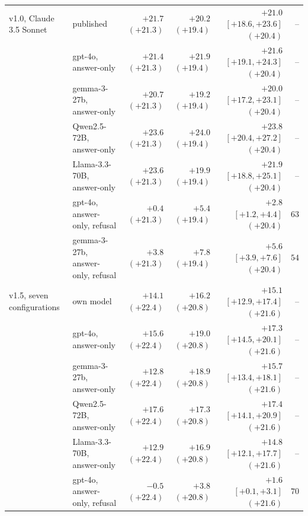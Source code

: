 \documentclass{article}
\begin{document}
\begin{table}[htbp]
{\begin{tabular}{llrrrr}
v1.0, Claude 3.5 Sonnet & published & $+21.7$ {\scriptsize$(+21.3)$} & $+20.2$ {\scriptsize$(+19.4)$} & $+21.0$ {\scriptsize$[+18.6,+23.6]$} {\scriptsize$(+20.4)$} & --\\
 & gpt-4o, answer-only & $+21.4$ {\scriptsize$(+21.3)$} & $+21.9$ {\scriptsize$(+19.4)$} & $+21.6$ {\scriptsize$[+19.1,+24.3]$} {\scriptsize$(+20.4)$} & --\\
 & gemma-3-27b, answer-only & $+20.7$ {\scriptsize$(+21.3)$} & $+19.2$ {\scriptsize$(+19.4)$} & $+20.0$ {\scriptsize$[+17.2,+23.1]$} {\scriptsize$(+20.4)$} & --\\
 & Qwen2.5-72B, answer-only & $+23.6$ {\scriptsize$(+21.3)$} & $+24.0$ {\scriptsize$(+19.4)$} & $+23.8$ {\scriptsize$[+20.4,+27.2]$} {\scriptsize$(+20.4)$} & --\\
 & Llama-3.3-70B, answer-only & $+23.6$ {\scriptsize$(+21.3)$} & $+19.9$ {\scriptsize$(+19.4)$} & $+21.9$ {\scriptsize$[+18.8,+25.1]$} {\scriptsize$(+20.4)$} & --\\
 & gpt-4o, answer-only, refusal & $+0.4$ {\scriptsize$(+21.3)$} & $+5.4$ {\scriptsize$(+19.4)$} & $+2.8$ {\scriptsize$[+1.2,+4.4]$} {\scriptsize$(+20.4)$} & $63$\\
 & gemma-3-27b, answer-only, refusal & $+3.8$ {\scriptsize$(+21.3)$} & $+7.8$ {\scriptsize$(+19.4)$} & $+5.6$ {\scriptsize$[+3.9,+7.6]$} {\scriptsize$(+20.4)$} & $54$\\
v1.5, seven configurations & own model & $+14.1$ {\scriptsize$(+22.4)$} & $+16.2$ {\scriptsize$(+20.8)$} & $+15.1$ {\scriptsize$[+12.9,+17.4]$} {\scriptsize$(+21.6)$} & --\\
 & gpt-4o, answer-only & $+15.6$ {\scriptsize$(+22.4)$} & $+19.0$ {\scriptsize$(+20.8)$} & $+17.3$ {\scriptsize$[+14.5,+20.1]$} {\scriptsize$(+21.6)$} & --\\
 & gemma-3-27b, answer-only & $+12.8$ {\scriptsize$(+22.4)$} & $+18.9$ {\scriptsize$(+20.8)$} & $+15.7$ {\scriptsize$[+13.4,+18.1]$} {\scriptsize$(+21.6)$} & --\\
 & Qwen2.5-72B, answer-only & $+17.6$ {\scriptsize$(+22.4)$} & $+17.3$ {\scriptsize$(+20.8)$} & $+17.4$ {\scriptsize$[+14.1,+20.9]$} {\scriptsize$(+21.6)$} & --\\
 & Llama-3.3-70B, answer-only & $+12.9$ {\scriptsize$(+22.4)$} & $+16.9$ {\scriptsize$(+20.8)$} & $+14.8$ {\scriptsize$[+12.1,+17.7]$} {\scriptsize$(+21.6)$} & --\\
 & gpt-4o, answer-only, refusal & $-0.5$ {\scriptsize$(+22.4)$} & $+3.8$ {\scriptsize$(+20.8)$} & $+1.6$ {\scriptsize$[+0.1,+3.1]$} {\scriptsize$(+21.6)$} & $70$\\

\end{tabular}}
\end{table}
\end{document}
